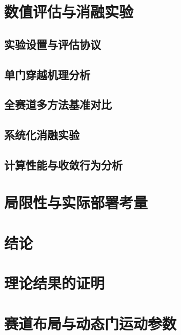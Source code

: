 \documentclass[journal]{IEEEtran}
\begin{document}
\section{数值评估与消融实验}

\subsection{实验设置与评估协议}

\subsection{单门穿越机理分析}

\subsection{全赛道多方法基准对比}

\subsection{系统化消融实验}

\subsection{计算性能与收敛行为分析}

\section{局限性与实际部署考量}

\section{结论}

\appendices
\section{理论结果的证明}

\section{赛道布局与动态门运动参数}
\end{document}
